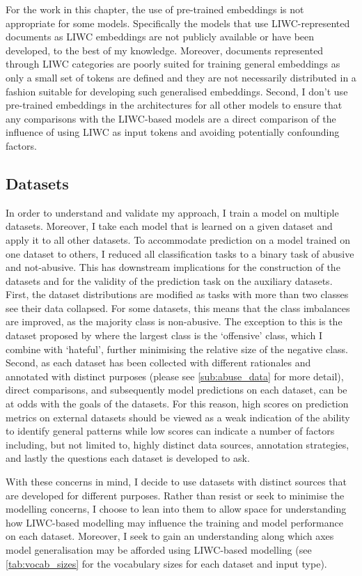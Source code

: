 For the work in this chapter, the use of pre-trained embeddings is not appropriate for some models. Specifically the models that use LIWC-represented documents as LIWC embeddings are not publicly available or have been developed, to the best of my knowledge. Moreover, documents represented through LIWC categories are poorly suited for training general embeddings as only a small set of tokens are defined and they are not necessarily distributed in a fashion suitable for developing such generalised  embeddings. Second, I don't use pre-trained embeddings in the architectures for all other models to ensure that any comparisons with the LIWC-based models are a direct comparison of the influence of using LIWC as input tokens and avoiding potentially confounding factors.

\subsection{Datasets}\label{sub:liwc_datasets}
In order to understand and validate my approach, I train a model on multiple datasets. Moreover, I take each model that is learned on a given dataset and apply it to all other datasets. To accommodate prediction on a model trained on one dataset to others, I reduced all classification tasks to a binary task of abusive and not-abusive. This has downstream implications for the construction of the datasets and for the validity of the prediction task on the auxiliary datasets.
First, the dataset distributions are modified as tasks with more than two classes see their data collapsed. For some datasets, this means that the class imbalances are improved, as the majority class is non-abusive. The exception to this is the dataset proposed by \citet{Davidson:2017} where the largest class is the `offensive' class, which I combine with `hateful', further minimising the relative size of the negative class.
Second, as each dataset has been collected with different rationales and annotated with distinct purposes (please see \cref{sub:abuse_data} for more detail), direct comparisons, and subsequently model predictions on each dataset, can be at odds with the goals of the datasets. For this reason, high scores on prediction metrics on external datasets should be viewed as a weak indication of the ability to identify general patterns while low scores can indicate a number of factors including, but not limited to, highly distinct data sources, annotation strategies, and lastly the questions each dataset is developed to ask.

With these concerns in mind, I decide to use datasets with distinct sources that are developed for different purposes. Rather than resist or seek to minimise the modelling concerns, I choose to lean into them to allow space for understanding how LIWC-based modelling may influence the training and model performance on each dataset. 
Moreover, I seek to gain an understanding along which axes model generalisation may be afforded using LIWC-based modelling (see \cref{tab:vocab_sizes} for the vocabulary sizes for each dataset and input type).

